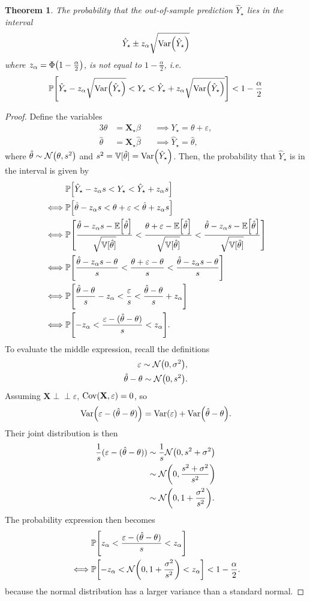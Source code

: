 \documentclass[letterpaper, reqno]{amsart}
\newtheorem{theorem}{Theorem}[section]
\numberwithin{equation}{section}
\newcommand{\vect}[1]{\boldsymbol{\mathbf{#1}}} %
\newcommand{\ie}{\emph{i.e.\ }}
\newcommand{\Prob}[1]{\mathbb{P}\mleft[#1\mright]}
\newcommand{\E}[1]{\mathbb{E}\mleft[#1\mright]}
\newcommand{\Var}[1]{\operatorname{Var}\mleft(#1\mright)}
\newcommand{\Cov}[1]{\operatorname{Cov}\mleft(#1\mright)}
\newcommand{\N}[2]{\mathcal{N}\mleft( #1, #2 \mright)}
\newcommand{\indep}{\perp \!\!\! \perp}  %
\newcommand{\Xv}{\vect{X}}
\newcommand{\Bvh}{\hat{\beta}}
\newcommand{\ve}{\varepsilon}
\newcommand{\thh}{\hat{\theta}}
\newcommand{\Xs}{\Xv_\star}
\newcommand{\Ys}{Y_\star}
\newcommand{\Yhs}{\hat{Y}_\star}
\newcommand{\Vth}{\mathbb{V}[\hat{\theta}]}
\newcommand{\za}{z_\alpha}
\begin{document}
\begin{theorem}
  The probability that the out-of-sample prediction $\Yhs$ lies in the interval
  \[ \Yhs \pm \za \sqrt{\Var{\Yhs}} \]
  where $\za = \Phi\mleft(1 - \frac{\alpha}{2}\mright)$, is \emph{not} equal to $1 - \frac{\alpha}{2}$, \ie
  \[ \Prob{ \Yhs - \za \sqrt{\Var{\Yhs}} 
           < \Ys 
           < \Yhs + \za \sqrt{\Var{\Yhs}}} 
      < 1 - \frac{\alpha}{2} \]
\end{theorem}

\begin{proof}
  Define the variables
  \begin{alignat*}{3}
    \theta &= \Xs \beta &&\implies \Ys = \theta + \ve, \\
    \thh &= \Xs \Bvh &&\implies \Yhs = \thh,
  \end{alignat*}
  where $\thh \sim \N{\theta}{s^2}$ and $s^2 = \Vth = \Var{\Yhs}$.
  Then, the probability that $\Yhs$ is in the interval is given by
  \begin{align*}
    &\Prob{\Yhs - \za s < \Ys < \Yhs + \za s}  \\
    \iff &\Prob{\thh - \za s < \theta + \ve < \thh + \za s} \\
    \iff &\Prob{\frac{\thh - \za s - \E{\thh}}{\sqrt{\Vth}}
              < \frac{\theta + \ve - \E{\thh}}{\sqrt{\Vth}}
              < \frac{\thh - \za s - \E{\thh}}{\sqrt{\Vth}}} \\
    \iff &\Prob{\frac{\thh - \za s - \theta}{s}
              < \frac{\theta + \ve - \theta}{s}
              < \frac{\thh - \za s - \theta}{s}} \\
    \iff &\Prob{\frac{\thh - \theta}{s} - \za
              < \frac{\ve}{s}
              < \frac{\thh - \theta}{s} + \za} \\
    \iff &\Prob{-\za < \frac{\ve - (\thh - \theta)}{s} < \za}.
  \end{align*}
  To evaluate the middle expression, recall the definitions
  \begin{align*}
    \ve \sim \N{0}{\sigma^2}, \\
    \thh - \theta \sim \N{0}{s^2}.
  \end{align*}
  Assuming $\Xv \indep \ve$, $\Cov{\Xv, \ve} = 0$, so
  \[ \Var{\ve - (\thh - \theta)} = \Var{\ve} + \Var{\thh - \theta}. \]
  Their joint distribution is then
  \begin{align*}
     \frac{1}{s}(\ve - (\thh - \theta)) &\sim \frac{1}{s}\N{0}{s^2 + \sigma^2} \\
     &\sim \N{0}{\frac{s^2 + \sigma^2}{s^2}} \\
     &\sim \N{0}{1 + \frac{\sigma^2}{s^2}}.
  \end{align*}
  The probability expression then becomes
  \begin{align*}
    &\Prob{\za < \frac{\ve - (\thh - \theta)}{s} < \za} \\
    \iff &\Prob{-\za < \N{0}{1 + \frac{\sigma^2}{s^2}} < \za}
    < 1 - \frac{\alpha}{2}.
  \end{align*}
  because the normal distribution has a larger variance than a standard normal.
\end{proof}
\end{document}
